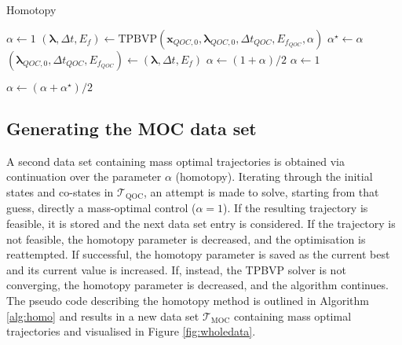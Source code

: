 \documentclass[graybox]{svmult}
\begin{document}
{\begin{algorithm}[h]
\caption{Homotopy}
\label{alg:homo}
\begin{algorithmic}[1]
\State $\alpha \gets 1$
\Loop
    \State $(\boldsymbol{\lambda}, \Delta t, E_f) \gets \text{TPBVP}(\mathbf{x}_{QOC, 0}, \boldsymbol{\lambda}_{QOC, 0}, \Delta t_{QOC}, E_{f_{QOC}}, \alpha)$
     
        \State $\alpha^\star \gets \alpha$
        \State $(\boldsymbol{\lambda}_{QOC, 0}, \Delta t_{QOC}, E_{f_{QOC}})
        \gets (\boldsymbol{\lambda}, \Delta t, E_f)$
            \State $\alpha \gets (1+\alpha)/2$ 
         
            \State $\alpha \gets 1$
         
            \State {}
        \EndIf
        
    \Else
        \State $\alpha \gets (\alpha + \alpha^\star)/2$
    \EndIf
    
\EndLoop
\EndProcedure
\end{algorithmic}
\end{algorithm}
\clearpage
}

\subsection{Generating the MOC data set}
A second data set containing mass optimal trajectories is obtained via continuation over the parameter $\alpha$ (homotopy). Iterating through the initial states and co-states in $\mathcal{T}_{\mbox{QOC}}$, an attempt is made to solve, starting from that guess, directly a mass-optimal control ($\alpha=1$). If the resulting trajectory is feasible, it is stored and the next data set entry is considered. If the trajectory is not feasible, the homotopy parameter is decreased, and the optimisation is reattempted. If successful, the homotopy parameter is saved as the current best and its current value is increased. If, instead, the TPBVP solver is not converging, the homotopy parameter is decreased, and the algorithm continues. The pseudo code describing the homotopy method is outlined in Algorithm \ref{alg:homo} and results in a new data set $\mathcal{T}_{\mbox{MOC}}$ containing mass optimal trajectories and visualised in Figure \ref{fig:wholedata}.
\end{document}
